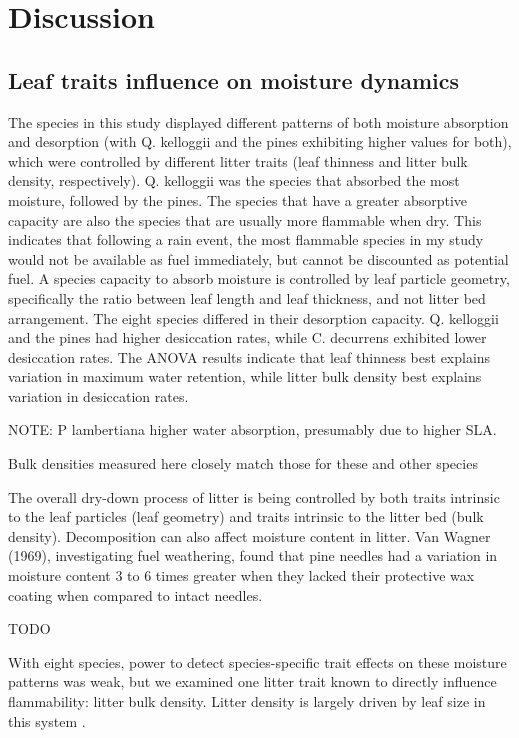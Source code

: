 \documentclass[fire,article,submit,moreauthors,pdftex]{Definitions/mdpi}
\begin{document}
\section{Discussion}

\subsection{Leaf traits influence on moisture dynamics }

The species in this study displayed different patterns of both moisture absorption and desorption (with Q. kelloggii and the pines exhibiting higher values for both), which were controlled by different litter traits (leaf thinness and litter bulk density, respectively). Q. kelloggii was the species that absorbed the most moisture, followed by the pines. The species that have a greater absorptive capacity are also the species that are usually more flammable when dry. This indicates that following a rain event, the most flammable species in my study would not be available as fuel immediately, but cannot be discounted as potential fuel. A species capacity to absorb moisture is controlled by leaf particle geometry, specifically the ratio between leaf length and leaf thickness, and not litter bed arrangement. The eight species differed in their desorption capacity. Q. kelloggii and the pines had higher desiccation rates, while C. decurrens exhibited lower desiccation rates. The ANOVA results indicate that leaf thinness best explains variation in maximum water retention, while litter bulk density best explains variation in desiccation rates.

NOTE: P lambertiana higher water absorption, presumably due to higher SLA.



Bulk densities measured here closely match those for these and other species \cite{van_Wagtendonk+Sydoriak+etal-1998,Stephens+Finney+etal-2004}

The overall dry-down process of litter is being controlled by both traits intrinsic to the leaf particles (leaf geometry) and traits intrinsic to the litter bed (bulk density). Decomposition can also affect moisture content in litter. Van Wagner (1969), investigating fuel weathering, found that pine needles had a variation in moisture content 3 to 6 times greater when they lacked their protective wax coating when compared to intact needles.


TODO

With eight species, power to detect species-specific trait effects on these moisture patterns was weak, but we examined one litter trait known to directly influence flammability: litter bulk density. Litter density is largely driven by leaf size in this system \cite{Magalhaes+Schwilk-2012}. 
\end{document}
